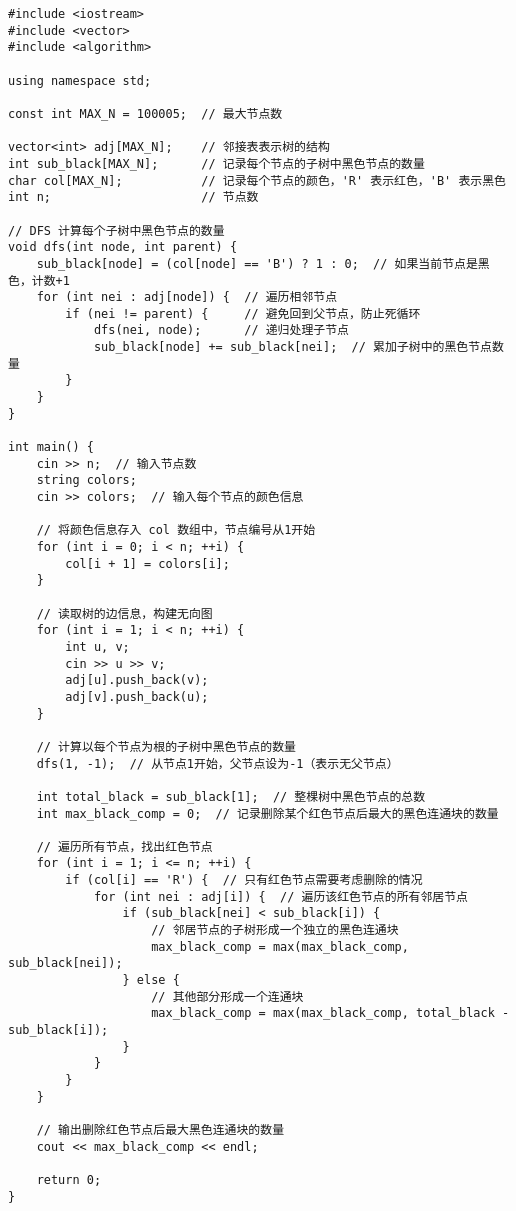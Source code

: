 \documentclass[a4paper]{ctexart}
\begin{document}
\begin{lstlisting}
#include <iostream>
#include <vector>
#include <algorithm>

using namespace std;

const int MAX_N = 100005;  // 最大节点数

vector<int> adj[MAX_N];    // 邻接表表示树的结构
int sub_black[MAX_N];      // 记录每个节点的子树中黑色节点的数量
char col[MAX_N];           // 记录每个节点的颜色，'R' 表示红色，'B' 表示黑色
int n;                     // 节点数

// DFS 计算每个子树中黑色节点的数量
void dfs(int node, int parent) {
	sub_black[node] = (col[node] == 'B') ? 1 : 0;  // 如果当前节点是黑色，计数+1
	for (int nei : adj[node]) {  // 遍历相邻节点
		if (nei != parent) {     // 避免回到父节点，防止死循环
			dfs(nei, node);      // 递归处理子节点
			sub_black[node] += sub_black[nei];  // 累加子树中的黑色节点数量
		}
	}
}

int main() {
	cin >> n;  // 输入节点数
	string colors;
	cin >> colors;  // 输入每个节点的颜色信息
	
	// 将颜色信息存入 col 数组中，节点编号从1开始
	for (int i = 0; i < n; ++i) {
		col[i + 1] = colors[i]; 
	}
	
	// 读取树的边信息，构建无向图
	for (int i = 1; i < n; ++i) {
		int u, v;
		cin >> u >> v;
		adj[u].push_back(v);
		adj[v].push_back(u);
	}
	
	// 计算以每个节点为根的子树中黑色节点的数量
	dfs(1, -1);  // 从节点1开始，父节点设为-1（表示无父节点）
	
	int total_black = sub_black[1];  // 整棵树中黑色节点的总数
	int max_black_comp = 0;  // 记录删除某个红色节点后最大的黑色连通块的数量
	
	// 遍历所有节点，找出红色节点
	for (int i = 1; i <= n; ++i) {
		if (col[i] == 'R') {  // 只有红色节点需要考虑删除的情况
			for (int nei : adj[i]) {  // 遍历该红色节点的所有邻居节点
				if (sub_black[nei] < sub_black[i]) {
					// 邻居节点的子树形成一个独立的黑色连通块
					max_black_comp = max(max_black_comp, sub_black[nei]);
				} else {
					// 其他部分形成一个连通块
					max_black_comp = max(max_black_comp, total_black - sub_black[i]);
				}
			}
		}
	}
	
	// 输出删除红色节点后最大黑色连通块的数量
	cout << max_black_comp << endl;
	
	return 0;
}

\end{lstlisting}
\end{document}
